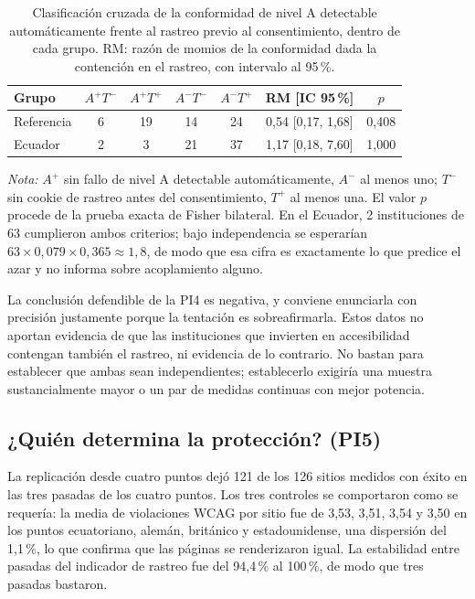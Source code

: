 \documentclass[pdflatex,sn-basic,Numbered]{sn-jnl}
\theoremstyle{thmstyleone}
\theoremstyle{thmstyletwo}
\theoremstyle{thmstylethree}
\begin{document}
\begin{table}[htbp]
	\centering
	\caption{Clasificaci\'on cruzada de la conformidad de nivel A detectable autom\'aticamente frente al rastreo previo al consentimiento, dentro de cada grupo. RM: raz\'on de momios de la conformidad dada la contenci\'on en el rastreo, con intervalo al 95\,\%.}\label{tab:joint}
	\small
	\begin{tabular}{@{}lcccccc@{}}
		\toprule
		\textbf{Grupo} & $A^{+}T^{-}$ & $A^{+}T^{+}$ & $A^{-}T^{-}$ & $A^{-}T^{+}$ & \textbf{RM [IC 95\,\%]} & \textbf{$p$} \\
		\midrule
		Referencia & 6 & 19 & 14 & 24 & 0,54 [0,17, 1,68] & 0,408 \\
		Ecuador & 2 & 3 & 21 & 37 & 1,17 [0,18, 7,60] & 1,000 \\
		\bottomrule
	\end{tabular}
	\par\vspace{3pt}
	\footnotesize\RaggedRight\textit{Nota:} $A^{+}$ sin fallo de nivel A detectable autom\'aticamente, $A^{-}$ al menos uno; $T^{-}$ sin cookie de rastreo antes del consentimiento, $T^{+}$ al menos una. El valor $p$ procede de la prueba exacta de Fisher bilateral. En el Ecuador, 2 instituciones de 63 cumplieron ambos criterios; bajo independencia se esperar\'ian $63 \times 0{,}079 \times 0{,}365 \approx 1{,}8$, de modo que esa cifra es exactamente lo que predice el azar y no informa sobre acoplamiento alguno.
\end{table}

La conclusi\'on defendible de la PI4 es negativa, y conviene enunciarla con precisi\'on justamente porque la tentaci\'on es sobreafirmarla. Estos datos no aportan evidencia de que las instituciones que invierten en accesibilidad contengan tambi\'en el rastreo, ni evidencia de lo contrario. No bastan para establecer que ambas sean independientes; establecerlo exigir\'ia una muestra sustancialmente mayor o un par de medidas continuas con mejor potencia.

\subsection{¿Qui\'en determina la protecci\'on? (PI5)}\label{sec:results-vantage}

La replicaci\'on desde cuatro puntos dej\'o 121 de los 126 sitios medidos con \'exito en las tres pasadas de los cuatro puntos. Los tres controles se comportaron como se requer\'ia: la media de violaciones WCAG por sitio fue de 3,53, 3,51, 3,54 y 3,50 en los puntos ecuatoriano, alem\'an, brit\'anico y estadounidense, una dispersi\'on del 1,1\,\%, lo que confirma que las p\'aginas se renderizaron igual. La estabilidad entre pasadas del indicador de rastreo fue del 94,4\,\% al 100\,\%, de modo que tres pasadas bastaron.
\end{document}
